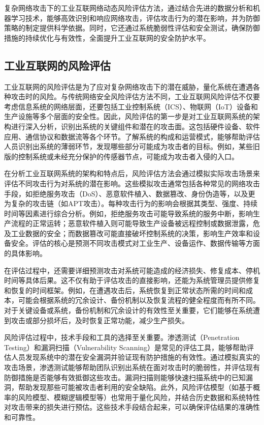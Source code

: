 复杂网络攻击下的工业互联网络动态风险评估方法，通过结合先进的数据分析和机器学习技术，能够高效识别和响应网络攻击，评估攻击行为的潜在影响，并为防御策略的制定提供科学依据。同时，它还通过系统脆弱性评估和安全测试，确保防御措施的持续优化与有效性，全面提升工业互联网的安全防护水平。

\subsection{工业互联网的风险评估}

工业互联网的风险评估是为了应对复杂网络攻击下的潜在威胁，量化系统在遭遇各种攻击时的风险。与传统网络安全风险评估方法不同，工业互联网风险评估不仅要考虑信息系统的网络层面，还要包括工业控制系统（ICS）、物联网（IoT）设备和生产设施等多个层面的安全性。因此，风险评估的第一步是对工业互联网系统的架构进行深入分析，识别出系统的关键组件和潜在的攻击面。这包括硬件设备、软件应用、通信协议和数据流等各个环节。了解系统的构成和运营模式，能够帮助评估人员识别出系统的薄弱环节，发现哪些部分可能成为攻击者的目标。例如，某些旧版的控制系统或未经充分保护的传感器节点，可能成为攻击者入侵的入口。

在分析工业互联网系统的架构和特点后，风险评估方法会通过模拟实际攻击场景来评估不同攻击行为对系统的潜在影响。这些模拟攻击通常包括各种常见的网络攻击手段，如拒绝服务攻击（DoS）、恶意软件植入、数据篡改、身份伪造等，以及更为复杂的攻击链（如APT攻击）。每种攻击行为的影响会根据其类型、强度、持续时间等因素进行综合分析。例如，拒绝服务攻击可能导致系统的服务中断，影响生产流程的正常运转；恶意软件植入则可能导致生产设备被远程控制或数据泄露，危及工业数据的安全；而数据篡改可能直接破坏控制系统的决策，影响生产效率和设备安全。评估的核心是预测不同攻击模式对工业生产、设备运作、数据传输等方面的具体影响。

在评估过程中，还需要详细预测攻击对系统可能造成的经济损失、修复成本、停机时间等具体后果。这不仅有助于评估攻击的直接影响，还能为系统管理员提供修复和恢复的时间框架。例如，在遭遇攻击后，系统恢复到正常状态所需的时间和成本，可能会根据系统的冗余设计、备份机制以及恢复流程的健全程度而有所不同。对于关键设备或系统，备份机制和冗余设计的有效性至关重要，它们能够在系统遭到攻击或部分损坏后，及时恢复正常功能，减少生产损失。

风险评估过程中，技术手段和工具的选择至关重要。渗透测试（Penetration Testing）和漏洞扫描（Vulnerability Scanning）是常见的评估工具，能够帮助评估人员发现系统中的潜在安全漏洞并验证现有防护措施的有效性。通过模拟真实的攻击场景，渗透测试能够帮助团队识别出系统在面对攻击时的脆弱性，并评估现有防御措施是否能够有效抵御这些攻击。漏洞扫描则能够快速扫描系统中的已知漏洞，帮助发现那些可能被攻击者利用的安全缺陷。此外，风险评估模型（如基于概率的风险模型、模糊逻辑模型等）也常用于量化风险，并结合历史数据和系统特性对攻击带来的损失进行预估。这些技术手段结合起来，可以确保评估结果的准确性和可靠性。

